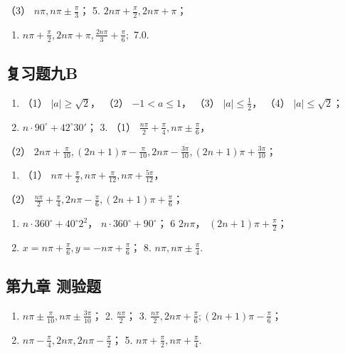 （3） \(n\pi, n\pi \pm \frac{\pi}{3}\)； 5.
\(2n\pi + \frac{\pi}{2}, 2n\pi + \pi\)；

\begin{enumerate}[start=6]
\item
  \(n\pi + \frac{\pi}{2}, 2n\pi + \pi, \frac{2n\pi}{3} + \frac{\pi}{6};\)
  7.0.
\end{enumerate}

\subsection{复习题九B}

\begin{enumerate}
\item
  （1） \(|a| \geqslant \sqrt{2}\)， （2） \(-1 < a \leqslant 1\)，
  （3） \(|a| \leqslant \frac{1}{2}\)， （4）
  \(|a| \leqslant \sqrt{2}\)；
\item
  \(n \cdot 90^{\circ} + 42^{\circ}30'\)； 3. （1）
  \(\frac{n\pi}{2} + \frac{\pi}{4}, n\pi \pm \frac{\pi}{6}\)，
\end{enumerate}

（2）
\(2n\pi + \frac{\pi}{10}, (2n + 1)\pi - \frac{\pi}{10}, 2n\pi - \frac{3\pi}{10}, (2n + 1)\pi + \frac{3\pi}{10}\)；

\begin{enumerate}[start=4]
\item
  （1）
  \(n\pi + \frac{\pi}{2}, n\pi + \frac{\pi}{12}, n\pi + \frac{5\pi}{12}\)，
\end{enumerate}

（2）
\(\frac{n\pi}{2} + \frac{\pi}{4}, 2n\pi - \frac{\pi}{6}, (2n + 1)\pi + \frac{\pi}{6}\)；

\begin{enumerate}[start=5]
\item
  \(n \cdot 360^{\circ} + 40^{\circ}2^{2}\)，
  \(n \cdot 360^{\circ} + 90^{\circ}\)； 6 \(2n\pi\)，
  \((2n + 1)\pi + \frac{\pi}{2}\)；
\item
  \(x = n\pi + \frac{\pi}{6}, y = -n\pi + \frac{\pi}{6}\)； 8.
  \(n\pi, n\pi \pm \frac{\pi}{4}\).
\end{enumerate}

\subsection{第九章 测验题}

\begin{enumerate}
\item
  \(n\pi \pm \frac{\pi}{10}, n\pi \pm \frac{3\pi}{10}\)； 2.
  \(\frac{n\pi}{2}\)； 3.
  \(\frac{n\pi}{2}, 2n\pi + \frac{\pi}{6}; (2n + 1)\pi - \frac{\pi}{6}\)；
\item
  \(n\pi - \frac{\pi}{4}, 2n\pi, 2n\pi - \frac{\pi}{2}\)； 5.
  \(n\pi + \frac{\pi}{2}, n\pi + \frac{\pi}{4}\).
\end{enumerate}

